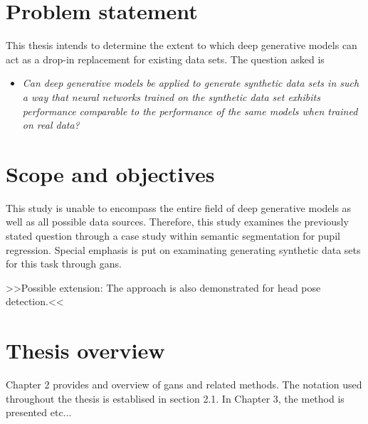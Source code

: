 \section{Problem statement}
This thesis intends to determine the extent to which deep generative models can act as a drop-in replacement for existing data sets. The question asked is

\begin{itemize}
    \item \textit{Can deep generative models be applied to generate synthetic data sets in such a way that neural networks trained on the synthetic data set exhibits performance comparable to the performance of the same models when trained on real data?}
\end{itemize}


\section{Scope and objectives}
This study is unable to encompass the entire field of deep generative models as well as all possible data sources. Therefore, this study examines the previously stated question through a case study within semantic segmentation for pupil regression. Special emphasis is put on examinating generating synthetic data sets for this task through \acrlong{gans}.

>>Possible extension: The approach is also demonstrated for head pose detection.<<

\section{Thesis overview}
Chapter 2 provides and overview of \acrlong{gans} and related methods. The notation used throughout the thesis is establised in section 2.1. In Chapter 3, the method is presented etc...



